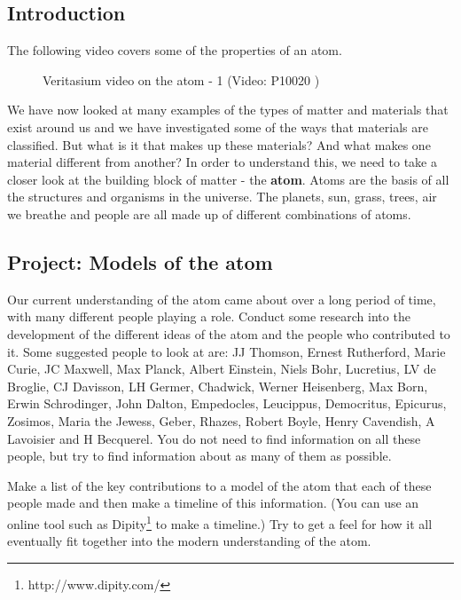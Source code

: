             \subsection{ Introduction}
            \nopagebreak
      \label{m38756*eip-794}The following video covers some of the properties of an atom.
    \setcounter{subfigure}{0}
	\begin{figure}[H] %
    \textnormal{Veritasium video on the atom - 1}\vspace{.1in} \nopagebreak
  \label{m38756*yt-media10}\label{m38756*yt-video10}
             { (Video:  P10020 )}
      \vspace{2pt}
    \vspace{.1in}
 \end{figure}       \par \label{m38756*id254141}We have now looked at many examples of the types of matter and materials that exist around us and we have investigated some of the ways that materials are classified. But what is it that makes up these materials? And what makes one material different from another? In order to understand this, we need to take a closer look at the building block of matter - the \textbf{atom}. Atoms are the basis of all the structures and organisms in the universe. The planets, sun, grass, trees, air we breathe and people are all made up of different combinations of atoms.\par 
    \label{m38756*eip-613}
            \subsection{ Project: Models of the atom}
            \nopagebreak
            \label{m38756*eip-3}
Our current understanding of the atom came about over a long period of time, with many different people playing a role. Conduct some research into the development of the different ideas of the atom and the people who contributed to it. Some suggested people to look at are: JJ Thomson, Ernest Rutherford, Marie Curie, JC Maxwell, Max Planck, Albert Einstein, Niels Bohr, Lucretius, LV de Broglie, CJ Davisson, LH Germer, Chadwick, Werner Heisenberg, Max Born, Erwin Schrodinger, John Dalton, Empedocles, Leucippus, Democritus, Epicurus, Zosimos, Maria the Jewess, Geber, Rhazes, Robert Boyle, Henry Cavendish, A Lavoisier and H Becquerel. You do not need to find information on all these people, but try to find information about as many of them as possible.
\par 
\label{m38756*id7342}Make a list of the key contributions to a model of the atom that each of these people made and then make a timeline of this information. (You can use an online tool such as Dipity\footnote{http://www.dipity.com/}
         to make a timeline.) Try to get a feel for how it all eventually fit together into the modern understanding of the atom. 
\par \label{m38756*cid2}
